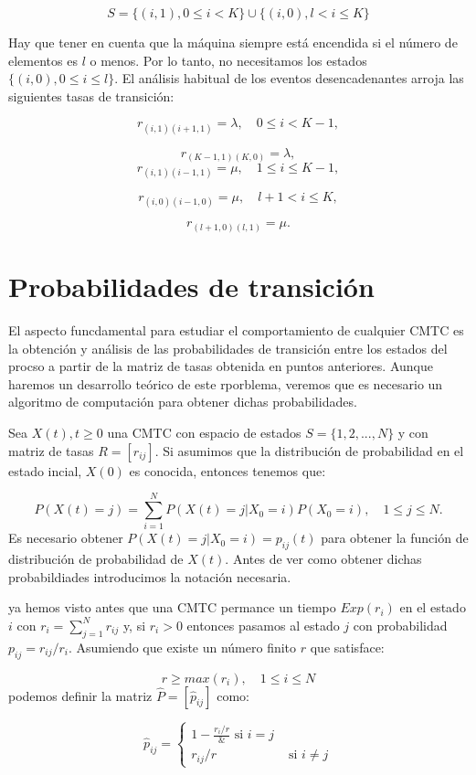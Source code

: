 \documentclass[
]{book}
\theoremstyle{definition}
\theoremstyle{definition}
\theoremstyle{definition}
\theoremstyle{definition}
\theoremstyle{remark}
\begin{document}
\[S = \{(i, 1), 0 \leq i < K\} \cup \{(i, 0), l < i \leq K\}\]

Hay que tener en cuenta que la máquina siempre está encendida si el número de elementos es \(l\) o menos. Por lo tanto, no necesitamos los estados \(\{(i, 0), 0 \leq i \leq l\}\). El análisis habitual de los eventos desencadenantes arroja las
siguientes tasas de transición:

\[r_{(i, 1)(i+1, 1)} = \lambda, \quad 0 \leq i < K-1,\]

\[r_{(K-1, 1)(K, 0)} = \lambda, \]
\[r_{(i, 1)(i-1, 1)} = \mu, \quad 1\leq i\leq K-1,\]

\[r_{(i, 0)(i-1, 0)} = \mu, \quad l+1 < i\leq K,\]

\[r_{(l+1, 0)(l, 1)} = \mu.\]

\hypertarget{CMTCF}{%
\section{Probabilidades de transición}\label{CMTCF}}

El aspecto funcdamental para estudiar el comportamiento de cualquier CMTC es la obtención y análisis de las probabilidades de transición entre los estados del procso a partir de la matriz de tasas obtenida en puntos anteriores. Aunque haremos un desarrollo teórico de este rporblema, veremos que es necesario un algoritmo de computación para obtener dichas probabilidades.

Sea \(X(t), t \geq 0\) una CMTC con espacio de estados \(S = \{1,2,...,N\}\) y con matriz de tasas \(R = [r_{ij}]\). Si asumimos que la distribución de probabilidad en el estado incial, \(X(0)\) es conocida, entonces tenemos que:

\[P(X(t) = j) = \sum_{i=1}^N P(X(t) = j | X_0 = i)P(X_0 = i), \quad 1 \leq j \leq N.\]
Es necesario obtener \(P(X(t) = j | X_0 = i) = p_{ij}(t)\) para obtener la función de distribución de probabilidad de \(X(t)\). Antes de ver como obtener dichas probabildiades introducimos la notación necesaria.

ya hemos visto antes que una CMTC permance un tiempo \(Exp(r_i)\) en el estado \(i\) con \(r_i = \sum_{j=1}^N r_{ij}\) y, si \(r_i > 0\) entonces pasamos al estado \(j\) con probabilidad \(p_{ij} = r_{ij}/r_i\). Asumiendo que existe un número finito \(r\) que satisface:

\[r \geq max(r_i), \quad 1\leq i \leq N\]
podemos definir la matriz \(\hat{P} = [\hat{p}_{ij}]\) como:

\begin{equation}
\hat{p}_{ij} = 
\begin{cases} 
1-\frac{r_i/r} & \text{ si } i=j\\
r_{ij}/r & \text{ si } i \neq j
\end{cases}
\end{equation}
\end{document}
